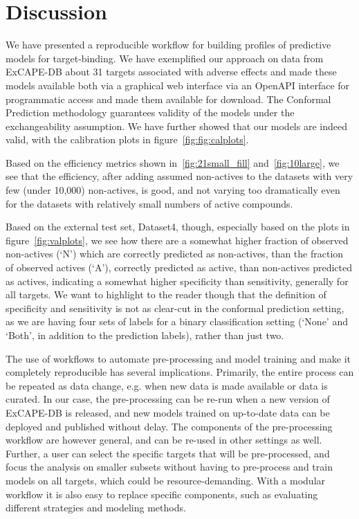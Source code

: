 \documentclass[utf8]{frontiersSCNS} %
\begin{document}
\section{Discussion} \label{Discussion}

We have presented a reproducible workflow for building profiles of predictive
models for target-binding. We have exemplified our approach on data from
ExCAPE-DB about 31 targets associated with adverse effects and made these
models available both via a graphical web interface via an OpenAPI interface
for programmatic access and made them available for download.
The Conformal Prediction methodology guarantees validity of the models under
the exchangeability assumption. We have further showed that our models are indeed
valid, with the calibration plots in figure~\ref{fig:fig:calplots}.

Based on the efficiency metrics shown in~\ref{fig:21small_fill}
and~\ref{fig:10large}, we see that the efficiency, after adding assumed
non-actives to the datasets with very few (under 10,000) non-actives, is
good, and not varying too dramatically even for the datasets with relatively
small numbers of active compounds.

Based on the external test set, Dataset4, though, especially based on the
plots in figure~\ref{fig:valplots}, we see how there are a somewhat higher
fraction of observed non-actives (`N') which are correctly predicted as
non-actives, than the fraction of observed actives (`A'), correctly predicted
as active, than non-actives predicted as actives, indicating a somewhat
higher specificity than sensitivity, generally for all targets.
We want to highlight to the reader though that the definition of specificity
and sensitivity is not as clear-cut in the conformal prediction setting, as
we are having four sets of labels for a binary classification setting (`None' and
`Both', in addition to the prediction labels), rather than just two.

The use of workflows to automate pre-processing and model training and make it
completely reproducible has several implications. Primarily, the entire process
can be repeated as data change, e.g. when new data is made available or data is
curated. In our case, the pre-processing can be re-run when a new version of
ExCAPE-DB is released, and new models trained on up-to-date data can be
deployed and published without delay. The components of the pre-processing
workflow are however general, and can be re-used in other settings as well.
Further, a user can select the specific targets that will be pre-processed, and
focus the analysis on smaller subsets without having to pre-process and train
models on all targets, which could be resource-demanding. With a modular
workflow it is also easy to replace specific components, such as evaluating
different strategies and modeling methods.
\end{document}
